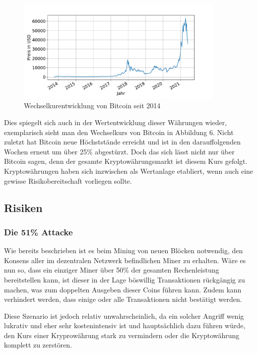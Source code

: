 \documentclass[12pt,oneside]{article}
\begin{document}
\begin{figure}[h]
\centering
\includegraphics[width=0.9\textwidth]{./images/btcchart.pdf}
\caption{Wechselkurentwicklung von Bitcoin seit 2014 \cite{coindesk2021}}
\centering
\end{figure}

Dies spiegelt sich auch in der Wertentwicklung dieser Währungen wieder, exemplarisch sieht man den Wechselkurs von Bitcoin in Abbildung 6. Nicht zuletzt hat Bitcoin neue Höchststände erreicht und ist in den darauffolgenden Wochen erneut um über 25\% abgestürzt. Doch das sich lässt nicht nur über Bitcoin sagen, denn der gesamte Kryptowährungsmarkt ist diesem Kurs gefolgt. Kryptowährungen haben sich inzwischen als Wertanlage etabliert, wenn auch eine gewisse Risikobereitschaft vorliegen sollte.\cite{coinmarketcap}
\subsection{Risiken}

\subsubsection{Die 51\% Attacke}

Wie bereits beschrieben ist es beim Mining von neuen Blöcken notwendig, den Konsens aller im dezentralen Netzwerk befindlichen Miner zu erhalten. Wäre es nun so, dass ein einziger Miner über 50\% der gesamten Rechenleistung bereitstellen kann, ist dieser in der Lage böswillig Transaktionen rückgängig zu machen, was zum doppelten Ausgeben dieser Coins führen kann. Zudem kann verhindert werden, dass einige oder alle Transaktionen nicht bestätigt werden. 

Diese Szenario ist jedoch relativ unwahrscheinlich, da ein solcher Angriff wenig lukrativ und eher sehr kostenintensiv ist und hauptsächlich dazu führen würde, den Kurs einer Kryprowährung stark zu vermindern oder die Kryptowährung komplett zu zerstören. \cite{binance2020}
\end{document}
